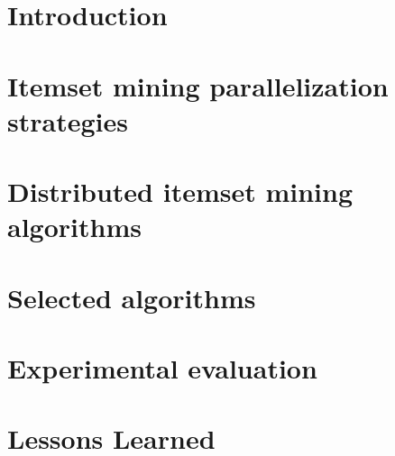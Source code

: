 
\section{Introduction}
\label{Introduction}

%
%

%

%
\label{Preliminaries}



\section{Itemset mining parallelization strategies}
\label{parallelization}


\section{Distributed itemset mining algorithms}
\label{algorithms}


\section{Selected algorithms}
\label{algorithms}




\section{Experimental evaluation}
\label{experimental}


\section{Lessons Learned}
\label{lesson}



